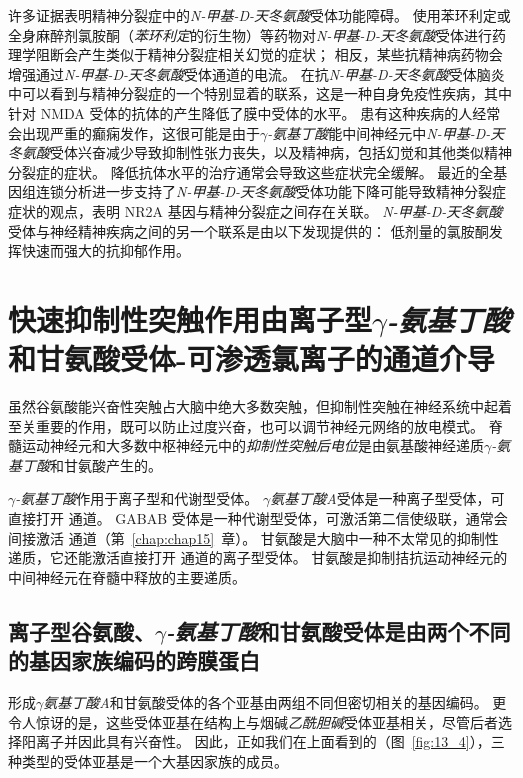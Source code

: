 许多证据表明精神分裂症中的\textit{N-甲基-D-天冬氨酸}受体功能障碍。
使用苯环利定或全身麻醉剂氯胺酮（\textit{苯环利定}的衍生物）等药物对\textit{N-甲基-D-天冬氨酸}受体进行药理学阻断会产生类似于精神分裂症相关幻觉的症状；
相反，某些抗精神病药物会增强通过\textit{N-甲基-D-天冬氨酸}受体通道的电流。
在抗\textit{N-甲基-D-天冬氨酸}受体脑炎中可以看到与精神分裂症的一个特别显着的联系，这是一种自身免疫性疾病，其中针对 NMDA 受体的抗体的产生降低了膜中受体的水平。
患有这种疾病的人经常会出现严重的癫痫发作，这很可能是由于\textit{$\gamma$-氨基丁酸}能中间神经元中\textit{N-甲基-D-天冬氨酸}受体兴奋减少导致抑制性张力丧失，以及精神病，包括幻觉和其他类似精神分裂症的症状。
降低抗体水平的治疗通常会导致这些症状完全缓解。
最近的全基因组连锁分析进一步支持了\textit{N-甲基-D-天冬氨酸}受体功能下降可能导致精神分裂症症状的观点，表明 NR2A 基因与精神分裂症之间存在关联。
\textit{N-甲基-D-天冬氨酸}受体与神经精神疾病之间的另一个联系是由以下发现提供的：
低剂量的氯胺酮发挥快速而强大的抗抑郁作用。



\section{快速抑制性突触作用由离子型\textit{$\gamma$-氨基丁酸}和甘氨酸受体-可渗透氯离子的通道介导}

虽然谷氨酸能兴奋性突触占大脑中绝大多数突触，但抑制性突触在神经系统中起着至关重要的作用，既可以防止过度兴奋，也可以调节神经元网络的放电模式。
脊髓运动神经元和大多数中枢神经元中的\textit{抑制性突触后电位}是由氨基酸神经递质\textit{$\gamma$-氨基丁酸}和甘氨酸产生的。


\textit{$\gamma$-氨基丁酸}作用于离子型和代谢型受体。
\textit{$\gamma$氨基丁酸A}受体是一种离子型受体，可直接打开  通道。
GABAB 受体是一种代谢型受体，可激活第二信使级联，通常会间接激活  通道（第~\ref{chap:chap15}~章）。 
甘氨酸是大脑中一种不太常见的抑制性递质，它还能激活直接打开  通道的离子型受体。
甘氨酸是抑制拮抗运动神经元的中间神经元在脊髓中释放的主要递质。



\subsection{离子型谷氨酸、\textit{$\gamma$-氨基丁酸}和甘氨酸受体是由两个不同的基因家族编码的跨膜蛋白}

形成\textit{$\gamma$氨基丁酸A}和甘氨酸受体的各个亚基由两组不同但密切相关的基因编码。
更令人惊讶的是，这些受体亚基在结构上与烟碱\textit{乙酰胆碱}受体亚基相关，尽管后者选择阳离子并因此具有兴奋性。 
因此，正如我们在上面看到的（图~\ref{fig:13_4}），三种类型的受体亚基是一个大基因家族的成员。


